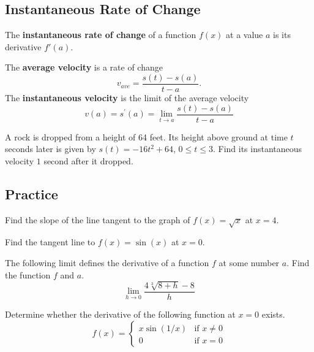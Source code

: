 \hypertarget{instantaneous-rate-of-change}{%
\subsection{Instantaneous Rate of
Change}\label{instantaneous-rate-of-change}}

\begin{definition}
The \textbf{instantaneous rate of change} of a function \(f(x)\) at a
value \(a\) is its derivative \(f'(a)\).
\end{definition}

The \textbf{average velocity} is a rate of change \[
v_{ave}=\frac{s(t)-s(a)}{t-a}.
\] The \textbf{instantaneous velocity} is the limit of the average
velocity \[
v(a)=s^{\prime}(a)=\lim\limits_{t \to a} \frac{s(t)-s(a)}{t-a}
\]

\begin{example}
A rock is dropped from a height of 64 feet. Its height above ground at
time \(t\) seconds later is given by \(s(t)=-16t^2+64\),
\(0\le t\le 3\). Find its instantaneous velocity \(1\) second after it
dropped.
\end{example}
\vspace*{6\baselineskip}

\subsection{Practice}




\begin{exercise}
  Find the slope of the line tangent to the graph of  $f(x)=\sqrt{x}$ at $x=4$.
\end{exercise}
\vspace*{6\baselineskip}

\begin{exercise}
Find the tangent line to \(f(x)=\sin(x)\) at \(x=0\).
\end{exercise}
\vspace*{6\baselineskip}

\begin{exercise}
The following limit defines the derivative of a function \(f\) at some
number \(a\). Find the function \(f\) and \(a\).
\[\lim\limits_{h\to 0}\dfrac{4\sqrt[3]{8+h}-8}{h}\]
\end{exercise}
\vspace*{6\baselineskip}

\begin{exercise}
Determine whether the derivative of the following function at \(x=0\)
exists. \[
f(x)=\begin{cases}x\sin(1/x)&{\text{if }}x\neq 0\\0&{\text{if }}x=0\end{cases}
\]
\end{exercise}
\vspace*{6\baselineskip}

